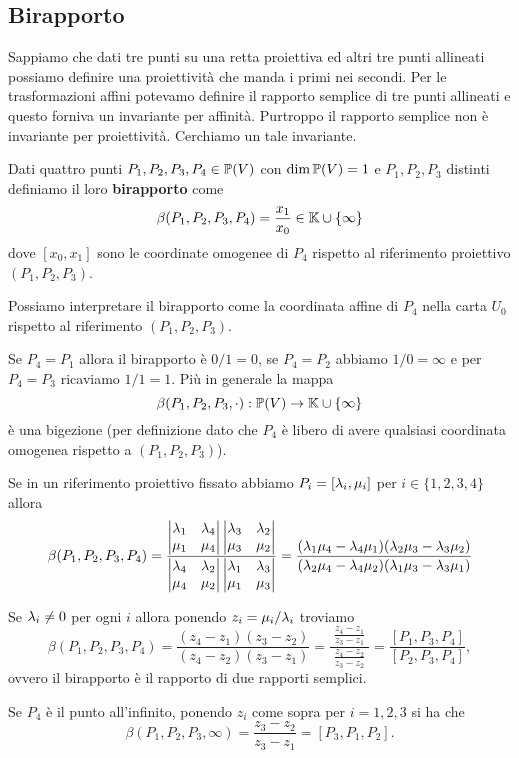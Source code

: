 \begin{multicols*}{2}
    \section{Birapporto}
    Sappiamo che dati tre punti su una retta proiettiva ed altri tre punti allineati possiamo definire una proiettivit\`a che manda i primi nei secondi. Per le trasformazioni affini potevamo definire il rapporto semplice di tre punti allineati e questo forniva un invariante per affinit\`a. Purtroppo il rapporto semplice non \`e invariante per proiettivit\`a. Cerchiamo un tale invariante.
    \begin{definition}[Birapporto]
    Dati quattro punti $P_1,P_2,P_3,P_4\in{\mathbb{P}(V)}$ con $\dim {\mathbb{P}(V)}=1$ e $P_1,P_2,P_3$ distinti definiamo il loro \textbf{birapporto} come
    \[\beta(P_1,P_2,P_3,P_4)=\frac{x_1}{x_0}\in\mathbb{K}\cup\{\infty\}\]
    dove $[x_0,x_1]$ sono le coordinate omogenee di $P_4$ rispetto al riferimento proiettivo $(P_1,P_2,P_3)$.
    \end{definition}
    \begin{remark}
    Possiamo interpretare il birapporto come la coordinata affine di $P_4$ nella carta $U_0$ rispetto al riferimento $(P_1,P_2,P_3)$.
    \end{remark}
    \begin{remark}
    Se $P_4=P_1$ allora il birapporto \`e $0/1=0$, se $P_4=P_2$ abbiamo $1/0=\infty$ e per $P_4=P_3$ ricaviamo $1/1=1$. Pi\`u in generale la mappa
    \[\beta(P_1,P_2,P_3,\cdot):{\mathbb{P}(V)}\to\mathbb{K}\cup\{\infty\}\]
    \`e una bigezione (per definizione dato che $P_4$ \`e libero di avere qualsiasi coordinata omogenea rispetto a $(P_1,P_2,P_3)$).
    \end{remark}
    \newcommand{\lamudmat}[2]{\left|
    \begin{matrix}
    \lambda_{#1} & \lambda_{#2}\\
    \mu_{#1} & \mu_{#2}
    \end{matrix}
    \right|}
    \begin{proposition}
    Se in un riferimento proiettivo fissato abbiamo $P_i=[\lambda_i,\mu_i]$ per $i\in\{1,2,3,4\}$ allora
    \small{\[\beta(P_1,P_2,P_3,P_4)=\frac{\lamudmat14\lamudmat32}{\lamudmat42\lamudmat13}=\frac{(\la_1\mu_4-\la_4\mu_1)(\la_2\mu_3-\la_3\mu_2)}{(\la_2\mu_4-\la_4\mu_2)(\la_1\mu_3-\la_3\mu_1)}\]}
    \end{proposition}
    \begin{remark}
    Se $\lambda_i\neq0$ per ogni $i$ allora ponendo $z_i=\mu_i/\lambda_i$ troviamo
    \[\beta(P_1,P_2,P_3,P_4)=\frac{(z_4-z_1)(z_3-z_2)}{(z_4-z_2)(z_3-z_1)}=\dfrac{\;\frac{z_4-z_1}{z_3-z_1}\;}{\frac{z_4-z_2}{z_3-z_2}}=\frac{[P_1,P_3,P_4]}{[P_2,P_3,P_4]},\]
    ovvero il birapporto \`e il rapporto di due rapporti semplici.
    \end{remark}
    \begin{corollary}
    Se $P_4$ \`e il punto all'infinito, ponendo $z_i$ come sopra per $i=1,2,3$ si ha che
    \[\beta(P_1,P_2,P_3,\infty)=\frac{z_3-z_2}{z_3-z_1}=[P_3,P_1,P_2].\]
    \end{corollary}


\end{multicols*}
